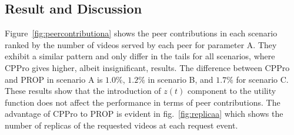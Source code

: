 \documentclass[10pt,final,journal,a4paper]{IEEEtran}
\begin{document}









\subsection{Result and Discussion}\label{resultanddiscussion}

Figure~\ref{fig:peercontributiona} shows the peer contributions in each scenario ranked by the number of videos served by each peer for parameter A.
They exhibit a similar pattern and only differ in the tails for all scenarios, where CPPro gives higher, albeit insignificant, results.
The difference between CPPro and PROP in scenario A is $1.0\%$, $1.2\%$ in scenario B, and $1.7\%$ for scenario C.
These results show that the introduction of $z(t)$ component to the utility function does not affect the performance in terms of peer contributions.
The advantage of CPPro to PROP is evident in fig.~\ref{fig:replicaa} which shows the number of replicas of the requested videos at each request event.
\end{document}
